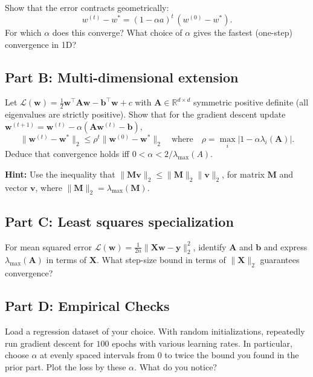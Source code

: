 \documentclass{article}
\begin{document}
Show that the error contracts geometrically:
\[
w^{(t)} - w^* = (1 - \alpha a)^t \,(w^{(0)} - w^*).
\]
For which $\alpha$ does this converge? What choice of $\alpha$ gives the fastest (one-step) convergence in 1D?

\subsection*{Part B: Multi-dimensional extension}
Let $\mathcal{L}(\mathbf{w}) = \tfrac12 \mathbf{w}^\top \mathbf{A} \mathbf{w} - \mathbf{b}^\top \mathbf{w} + c$ with $\mathbf{A} \in \mathbb{R}^{d\times d}$ symmetric positive definite (all eigenvalues are strictly positive).
Show that for the gradient descent update $\mathbf{w}^{(t+1)}=\mathbf{w}^{(t)}-\alpha(\mathbf{A} \mathbf{w}^{(t)}-\mathbf{b})$,
\[
\|\mathbf{w}^{(t)}-\mathbf{w}^*\|_2 \le \rho^t \|\mathbf{w}^{(0)}-\mathbf{w}^*\|_2
\quad\text{where}\quad
\rho = \max_i |1-\alpha \lambda_i(\mathbf{A})|.
\]
Deduce that convergence holds iff $0<\alpha<2/\lambda_{\max}(A)$.

\textbf{Hint:} Use the inequality that $\| \mathbf{M v} \|_2 \leq \| \mathbf{M} \|_2 \|\mathbf{v}\|_2$, for matrix $\mathbf{M}$ and vector $\mathbf{v}$, where $\| \mathbf{M} \|_2 = \lambda_{\text{max}} (\mathbf{M})$.

\subsection*{Part C: Least squares specialization}
For mean squared error $\mathcal{L}(\mathbf{w})=\tfrac1{2n}\|\mathbf{X}\mathbf{w}-\mathbf{y}\|_2^2$, identify $\mathbf{A}$ and $\mathbf{b}$ and express $\lambda_{\max}(\mathbf{A})$ in terms of $\mathbf{X}$. What step-size bound in terms of $\|\mathbf{X}\|_2$ guarantees convergence?

\subsection*{Part D: Empirical Checks}

Load a regression dataset of your choice.
With random initializations, repeatedly run gradient descent for $100$ epochs with various learning rates.
In particular, choose $\alpha$ at evenly spaced intervals from $0$ to twice the bound you found in the prior part.
Plot the loss by these $\alpha$.
What do you notice?
\end{document}
